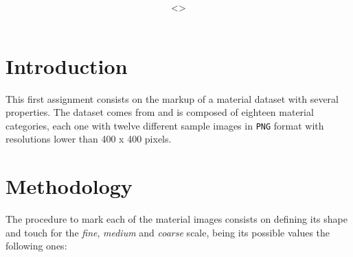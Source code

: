 \documentclass[12pt,a4paper]{article}
\title{\vspace{2in}\textmd{\hmwkClass\\\textbf{\hmwkTitle}}\\\normalsize\vspace{0.1in}\small{\hmwkDueDate}\\\vspace{4in}}
\date{}
\author{\textbf{\hmwkAuthorNameA} \\<\texttt{\href{mailto:ruizcep2@illinois.edu}{\hmwkAuthorEmailA}}>}
\begin{document}
\begin{singlespace}

\begin{titlepage}
\maketitle
\thispagestyle{empty}
\end{titlepage}

\hypertarget{toc}{}
\tableofcontents
\newpage



\clearpage

\newcommand{\e}[1]{\emph{#1}\xspace}

\section{Introduction}
This first assignment consists on the markup of a material dataset with several properties. The dataset comes from\cite{Liao_2013_CVPR} and is composed of eighteen material categories, each one with twelve different sample images in \texttt{PNG} format with resolutions lower than 400 x 400 pixels.

\section{Methodology}
The procedure to mark each of the material images consists on defining its shape and touch for the \e{fine}, \e{medium} and \e{coarse} scale, being its possible values the following ones:

\newcommand{\Fine}{\textbf{Fine}}
\newcommand{\Medium}{\textbf{Medium}}
\newcommand{\Coarse}{\textbf{Coarse}}

\newcommand{\sfl}{\e{flat}}
\newcommand{\sro}{\e{round}}
\newcommand{\sexor}{\e{extended organized}}
\newcommand{\sexdi}{\e{extended disorganized}}

\newcommand{\tfu}{\e{furry}} 
\newcommand{\tfe}{\e{feathery}} 
\newcommand{\tco}{\e{coarse}} 
\newcommand{\tro}{\e{rough}} 
\newcommand{\tbu}{\e{bumpy}} 
\newcommand{\tsc}{\e{scratchy}} 
\newcommand{\tsm}{\e{smooth}} 
\newcommand{\tve}{\e{velvety}}


\end{singlespace}
\end{document}
